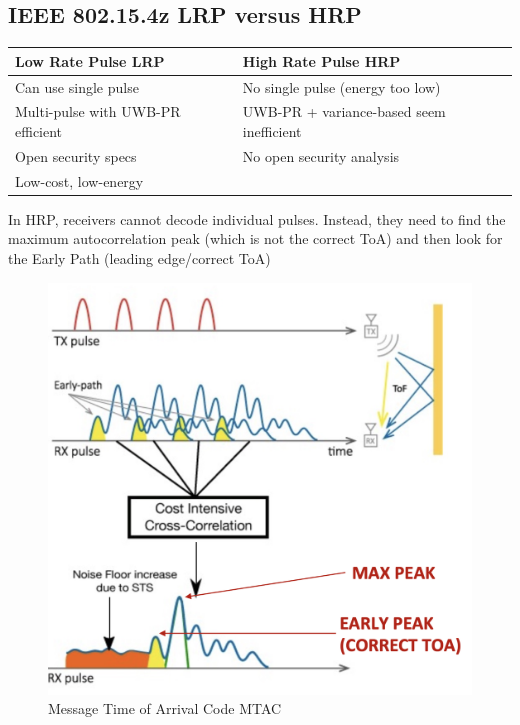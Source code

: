 \subsection{IEEE 802.15.4z LRP versus HRP}
\begin{table}[h]
	\centering
	\begin{tabular}{ll}
	\hline
	Low Rate Pulse LRP                & High Rate Pulse HRP                      \\ \hline
	Can use single pulse              & No single pulse (energy too low)         \\
	Multi-pulse with UWB-PR efficient & UWB-PR + variance-based seem inefficient \\
	Open security specs               & No open security analysis                \\ 
	Low-cost, low-energy              &                                   		 \\ \hline      
	\end{tabular}
	\end{table}

In HRP, receivers cannot decode individual pulses. Instead, they need to find the maximum autocorrelation peak (which is not the correct ToA) and then look for the Early Path (leading edge/correct ToA)
\begin{figure}[h]
	\centering
	\includegraphics[scale=0.4]{images/5-early-peak.png}
	\caption{Message Time of Arrival Code MTAC}%
	\label{fig:earlypeak}
\end{figure}

